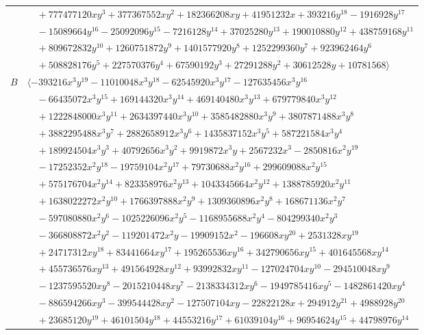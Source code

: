 \documentclass[11pt]{article}
\begin{document}
\begin{longtable}{@{}ll@{}}
 & $\quad +777477120xy^{3}+377367552xy^{2}+182366208xy+41951232x+393216y^{18}-1916928y^{17}$\\
 & $\quad -15089664y^{16}-25092096y^{15}-7216128y^{14}+37025280y^{13}+190010880y^{12}+438759168y^{11}$\\
 & $\quad +809672832y^{10}+1260751872y^{9}+1401577920y^{8}+1252299360y^{7}+923962464y^{6}$\\
 & $\quad +508828176y^{5}+227570376y^{4}+67590192y^{3}+27291288y^{2}+30612528y+10781568\rangle$\\
$B$ & $\langle -393216x^{3}y^{19}-11010048x^{3}y^{18}-62545920x^{3}y^{17}-127635456x^{3}y^{16}$\\
 & $\quad -66435072x^{3}y^{15}+169144320x^{3}y^{14}+469140480x^{3}y^{13}+679779840x^{3}y^{12}$\\
 & $\quad +1222848000x^{3}y^{11}+2634397440x^{3}y^{10}+3585482880x^{3}y^{9}+3807871488x^{3}y^{8}$\\
 & $\quad +3882295488x^{3}y^{7}+2882658912x^{3}y^{6}+1435837152x^{3}y^{5}+587221584x^{3}y^{4}$\\
 & $\quad +189924504x^{3}y^{3}+40792656x^{3}y^{2}+9919872x^{3}y+2567232x^{3}-2850816x^{2}y^{19}$\\
 & $\quad -17252352x^{2}y^{18}-19759104x^{2}y^{17}+79730688x^{2}y^{16}+299609088x^{2}y^{15}$\\
 & $\quad +575176704x^{2}y^{14}+823358976x^{2}y^{13}+1043345664x^{2}y^{12}+1388785920x^{2}y^{11}$\\
 & $\quad +1638022272x^{2}y^{10}+1766397888x^{2}y^{9}+1309360896x^{2}y^{8}+168671136x^{2}y^{7}$\\
 & $\quad -597080880x^{2}y^{6}-1025226096x^{2}y^{5}-1168955688x^{2}y^{4}-804299340x^{2}y^{3}$\\
 & $\quad -366808872x^{2}y^{2}-119201472x^{2}y-19909152x^{2}-196608xy^{20}+2531328xy^{19}$\\
 & $\quad +24717312xy^{18}+83441664xy^{17}+195265536xy^{16}+342790656xy^{15}+401645568xy^{14}$\\
 & $\quad +455736576xy^{13}+491564928xy^{12}+93992832xy^{11}-127024704xy^{10}-294510048xy^{9}$\\
 & $\quad -1237595520xy^{8}-2015210448xy^{7}-2138334312xy^{6}-1949785416xy^{5}-1482861420xy^{4}$\\
 & $\quad -886594266xy^{3}-399544428xy^{2}-127507104xy-22822128x+294912y^{21}+4988928y^{20}$\\
 & $\quad +23685120y^{19}+46101504y^{18}+44553216y^{17}+61039104y^{16}+96954624y^{15}+44798976y^{14}$\\

\end{longtable}
\end{document}
